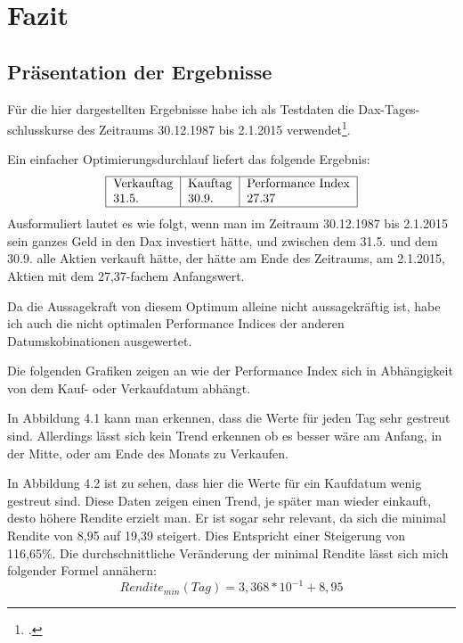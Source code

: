 \documentclass[12pt, a4paper, titlepage]{report}
\begin{document}
    \chapter{Fazit}

		
		

		
        \section{Präsentation der Ergebnisse}
        Für die hier dargestellten Ergebnisse habe ich als Testdaten die Dax-Tages-\\schlusskurse
		des Zeitraums 30.12.1987 bis 2.1.2015 verwendet\footcite{yahooFinance}. 
		
		Ein einfacher Optimierungsdurchlauf liefert das folgende Ergebnis:
		\begin{equation}
		\begin{tabular}{|l|l|l|}
		\hline
			Verkauftag & Kauftag & Performance Index\\
			31.5. & 30.9. & 27.37\\
		\hline
		\end{tabular}
		\end{equation}
		Ausformuliert lautet es wie folgt, wenn man im Zeitraum 30.12.1987 bis 2.1.2015 sein ganzes
		Geld in den Dax investiert hätte, und zwischen dem 31.5. und dem 30.9. alle Aktien
		verkauft hätte, der hätte am Ende des Zeitraums, am 2.1.2015, Aktien mit dem 27,37-fachem
		Anfangswert.
		
		Da die Aussagekraft von diesem Optimum alleine nicht aussagekräftig ist, habe ich auch
		die nicht optimalen Performance Indices der anderen Datumskobinationen ausgewertet.
		
		Die folgenden Grafiken zeigen an wie der Performance Index sich in Abhängigkeit von
		dem Kauf- oder Verkaufdatum abhängt.
		
		In Abbildung 4.1 kann man erkennen, dass die Werte für jeden Tag sehr gestreut sind.
		Allerdings lässt sich kein Trend erkennen ob es besser wäre am Anfang, in der Mitte, oder
		am Ende des Monats zu Verkaufen.
		
		In Abbildung 4.2 ist zu sehen, dass hier die Werte für ein Kaufdatum wenig gestreut sind.
		Diese Daten zeigen einen Trend, je später man wieder einkauft, desto höhere Rendite erzielt
		man. Er ist sogar sehr relevant, da sich die minimal Rendite von 8,95 auf 19,39 steigert.
		Dies Entspricht einer Steigerung von 116,65\%. Die durchschnittliche Veränderung der
		minimal Rendite lässt sich mich folgender Formel annähern:
		\begin{equation}
		Rendite_{min}(Tag) = 3,368 * 10^{-1} + 8,95
		\end{equation}
		
\end{document}
